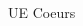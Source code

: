 \documentclass[t,compress,mathserif,12pt,xcolor=dvipsnames]{beamer}
\begin{document}
\begin{frame}[t]{UE Coeurs}
\begin{minipage}[t][5.0cm][t]{\textwidth}
\begin{columns}[T]
\begin{column}{0.04\textwidth}
      \end{column}
      \begin{column}{0.33\textwidth}

\end{column}
\end{columns}
\end{minipage}
\end{frame}
\end{document}
